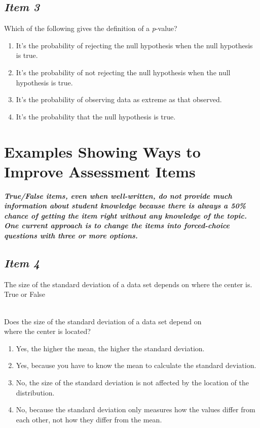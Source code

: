 \documentclass[twoside,openany]{tufte-book}
\begin{document}
\subsection{\textbf{\textit{Item 3}}}
Which of the following gives the definition of a \textit{p}-value?
\renewcommand{\labelenumi}{\Alph{enumi}.}
\begin{enumerate} [leftmargin=1cm, itemsep=.2em]
\item It's the probability of rejecting the null hypothesis when the null hypothesis is true.
\item It's the probability of not rejecting the null hypothesis when the null hypothesis is true.
\item It's the probability of observing data as extreme as that observed.
\item It's the probability that the null hypothesis is true.
\end{enumerate}



\section{\textbf{Examples Showing Ways to Improve Assessment Items}}
\textbf{\textit{True/False items, even when well-written, do not provide much information about student knowledge because there is always a 50\% chance of getting the item right without any knowledge of the topic. One current approach is to change the items into forced-choice questions with three or more options.}}

\subsection{\textbf{\textit{Item 4}}}
The size of the standard deviation of a data set depends on where the center is. True or False\\
\vspace{8pt}

\noindent{} \\
 Does the size of the standard deviation of a data set depend on \\ \indent where the center is located?
\begin{enumerate} [leftmargin=1.5cm, itemsep=.2em]
\item Yes, the higher the mean, the higher the standard deviation.
\item Yes, because you have to know the mean to calculate the standard deviation.
\item No, the size of the standard deviation is not affected by the location of the distribution.
\item No, because the standard deviation only measures how the values differ from each other, not how they differ from the mean.
 \end{enumerate}
\end{document}
